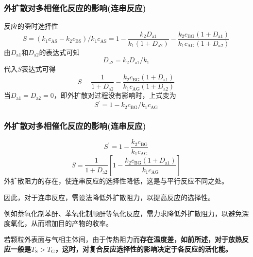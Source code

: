 \documentclass[dvipsnames, svgnames, x11names]{beamer}
\begin{document}
\begin{frame}
    \frametitle{外扩散对多相催化反应的影响(连串反应)}

    反应的瞬时选择性
    \[
        S=\left(k_{1} c_{\mathrm{AS}}-k_{2} c_{\mathrm{BS}}\right) / k_{1} c_{\mathrm{AS}}=1-\frac{k_{2} D_{\mathrm{a} 1}}{k_{1}\left(1+D_{\mathrm{a} 2}\right)}-\frac{k_{2} c_{\mathrm{BG}}\left(1+D_{\mathrm{a} 1}\right)}{k_{1} c_{\mathrm{AG}}\left(1+D_{\mathrm{a} 2}\right)}
    \]
    由$D_{\mathrm{a} 1}$和$D_{\mathrm{a} 2}$的表达式可知
    \[
        D_{\mathrm{a} 2} = k_2 D_{\mathrm{a} 1}/k_1
    \]
    代入$S$表达式可得
    \[
        S=\frac{1}{1+D_{\mathrm{a} 2}}-\frac{k_{2} c_{\mathrm{BG}}\left(1+D_{\mathrm{a} 1}\right)}{k_{1} c_{\mathrm{AG}}\left(1+D_{\mathrm{a} 2}\right)} 
    \]
    当$D_{\mathrm{a} 1} = D_{\mathrm{a} 2} = 0$，即外扩散对过程没有影响时，上式变为
    \[
        S^{\prime}=1-k_{2} c_{\mathrm{BG}} / k_{1} c_{\mathrm{AG}}
    \]

\end{frame}


\begin{frame}
    \frametitle{外扩散对多相催化反应的影响(连串反应)}
    \[
        S^{\prime}=1-\frac{k_{2} c_{\mathrm{BG}}}{k_{1} c_{\mathrm{AG}}} 
    \]
    \[
        S=\frac{1}{1+D_{\mathrm{a} 2}}\left[ 1-\frac{k_{2} c_{\mathrm{BG}}\left(1+D_{\mathrm{a} 1}\right)}{k_{1} c_{\mathrm{AG}}} \right]
    \]
    外扩散阻力的存在，使连串反应的选择性降低，这是与平行反应不同之处。
    
    因此，对于连串反应，需设法降低外扩散阻力，以提高反应的选择性。
    
    例如萘氧化制苯酐、苯氧化制顺酐等氧化反应，需力求降低外扩散阻力，以避免深度氧化，从而增加目的产物的收率。

    若颗粒外表面与气相主体间，由于传热阻力而\bf{存在温度差}，如前所述，对于放热反应一般是$T_\mathrm{S} > T_\mathrm{G}$，这时，对复合反应选择性的影响决定于各反应的活化能。

\end{frame}
\end{document}
